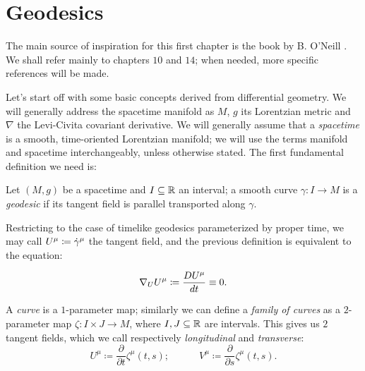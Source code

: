 \section{Geodesics}

\label{sec:geodesics}

The main source of inspiration for this first chapter is the book by B. O'Neill \cite{o1983semi}. We shall refer mainly to chapters \(10\) and \(14\); when needed, more specific references will be made.

Let's start off with some basic concepts derived from differential geometry. We will generally address the spacetime manifold as \(M\), \(g\) its Lorentzian metric and \(\nabla\) the Levi-Civita covariant derivative.
We will generally assume that a \emph{spacetime} is a smooth, time-oriented Lorentzian manifold; we will use the terms manifold and spacetime interchangeably, unless otherwise stated.
The first fundamental definition we need is:
\begin{definition}
	Let \((M, g)\) be a spacetime and \(I \subseteq {\mathbb{R}}\) an interval; a smooth curve \(\gamma : I \rightarrow M\) is a \emph{geodesic} if its tangent field is parallel transported along \(\gamma\).
\end{definition}    


Restricting to the case of timelike geodesics parameterized by proper time, we may call \(U\indices{^{\mu}} \coloneqq \dot{\gamma}^{\mu}\) the tangent field, and the previous definition is equivalent to the equation:

\begin{equation}
\label{eq:tang-trans-fields}
\nabla_U U^{\mu} \coloneqq \frac{D\tensor{U}{^\mu} }{dt} \equiv 0.
\end{equation}



A \emph{curve} is a \(1\)-parameter map; similarly we can define a \emph{family of curves} as a \(2\)-parameter map \(\zeta: I \times J \rightarrow M\), where \(I, J \subseteq {\mathbb{R}}\) are intervals. This gives us \(2\) tangent fields, which we call respectively \emph{longitudinal} and \emph{transverse}:
\[
U^{\mu} \coloneqq \frac{\partial}{\partial t} \zeta^{\mu}(t,s); \quad \quad \quad 
V^{\mu} \coloneqq \frac{\partial}{\partial s} \zeta^{\mu}(t,s). 
\]

